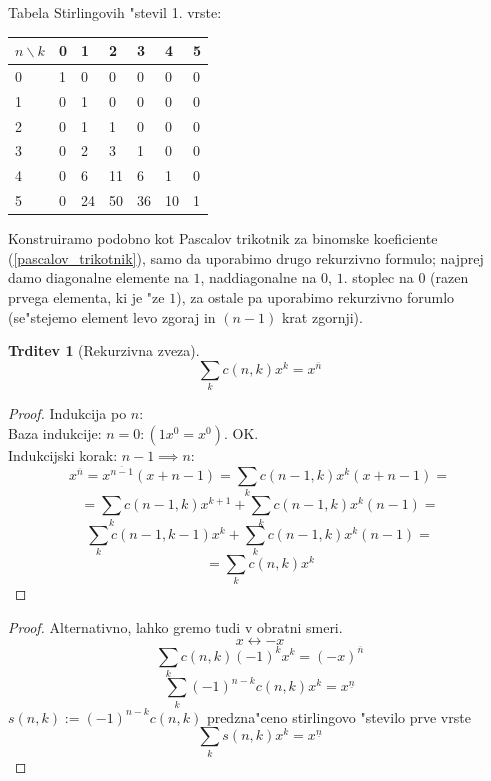 \documentclass[a4paper,12pt]{article}
\theoremstyle{definition}
\newtheorem{claim}[counter]{Trditev}
\theoremstyle{remark}
\begin{document}
Tabela Stirlingovih "stevil 1. vrste:
\begin{center}
	\begin{tabular}{l|llllll}
	    $n \backslash k$ & 0 & 1  & 2  & 3  & 4  & 5 \\
	    \hline
	    0 & 1 & 0  & 0  & 0  & 0  & 0 \\
	    1 & 0 & 1  & 0  & 0  & 0  & 0 \\
	    2 & 0 & 1  & 1  & 0  & 0  & 0 \\
	    3 & 0 & 2  & 3  & 1  & 0  & 0 \\
	    4 & 0 & 6  & 11 & 6  & 1  & 0 \\
	    5 & 0 & 24 & 50 & 36 & 10 & 1
	\end{tabular}
\end{center}
Konstruiramo podobno kot Pascalov trikotnik za binomske koeficiente (\ref{pascalov_trikotnik}), samo da uporabimo drugo rekurzivno formulo; najprej damo diagonalne elemente na $1$, naddiagonalne na $0$, $1$. stoplec na 0 (razen prvega elementa, ki je "ze $1$), za ostale pa uporabimo rekurzivno forumlo (se"stejemo element levo zgoraj in $(n-1)$ krat zgornji). \label{konstrukcija_tabele}

\begin{claim}[Rekurzivna zveza]
    \[\sum_k c(n,k)x^k = x^{\overline{n}}\]
\end{claim}

\begin{proof}
    Indukcija po $n$:\\
    Baza indukcije: $n = 0: (1x^0 = x^0)$. OK.\\
    Indukcijski korak: $n - 1 \implies n$:\\
    \[x^{\overline{n}} = x^{\overline{n-1}}(x+n-1) = \sum_k c(n-1,k)x^k (x+n-1) =\]
    \[= \sum_k c(n-1,k)x^{k+1} + \sum_k c(n-1,k)x^k (n-1) = \]
    \[\sum_k c(n-1,k-1)x^{k} + \sum_k c(n-1,k)x^k (n-1) =\]
    \[= \sum_k c(n,k)x^k\]
\end{proof}

\begin{proof}
	Alternativno, lahko gremo tudi v obratni smeri.
	\[x \leftrightarrow -x\] \label{TODO: I see x <-> -x, I skip.}
	\[\sum_k c(n,k) (-1)^k x^k = (-x)^{\overline{n}}\]
	\[\sum_k (-1)^{n-k} c(n,k) x^k = x^{\underline{n}}\]
	$s(n,k) := (-1)^{n-k} c(n,k)$ predzna"ceno stirlingovo "stevilo prve vrste
	\[\sum_k s(n,k) x^k = x^{\underline{n}}\]
\end{proof}
\end{document}
